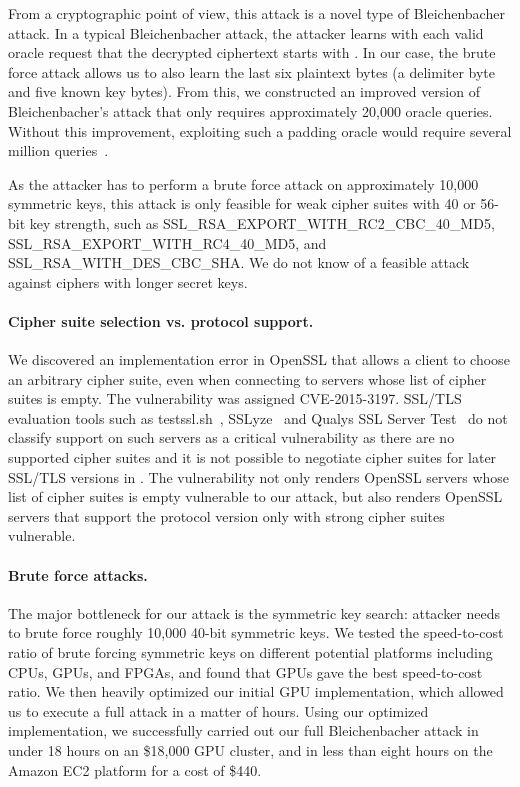 From a cryptographic point of view, this attack is a novel type of Bleichenbacher attack. In a typical Bleichenbacher attack, the attacker learns with each valid oracle request that the decrypted ciphertext starts with . In our case, the brute force attack allows us to also learn the last six plaintext bytes (a delimiter byte  and five known key bytes). From this, we constructed an improved version of Bleichenbacher's attack that only requires approximately 20,000 oracle queries. Without this improvement, exploiting such a padding oracle would require several million queries~\cite{bardou2012efficient}.

As the attacker has to perform a brute force attack on approximately 10,000 symmetric keys, this attack is only feasible for weak cipher suites with 40 or 56-bit key strength, such as SSL\_RSA\_EXPORT\_WITH\_RC2\_CBC\_40\_MD5, SSL\_RSA\_EXPORT\_WITH\_RC4\_40\_MD5, and SSL\_RSA\_WITH\_DES\_CBC\_SHA\@. We do not know of a feasible attack against ciphers with longer secret keys.

\paragraph{Cipher suite selection vs. protocol support.}
We discovered an implementation error in OpenSSL that allows a client to choose an arbitrary \ssltwo cipher suite, even when connecting to servers whose list of \ssltwo cipher suites is empty.
The vulnerability was assigned CVE-2015-3197.
SSL/TLS evaluation tools such as testssl.sh~\cite{testssl}, SSLyze~\cite{sslyze} and Qualys SSL Server Test~\cite{ssltest} do not classify \ssltwo support on such servers as a critical vulnerability as there are no supported cipher suites and it is not possible to negotiate cipher suites for later SSL/TLS versions in \ssltwo.
The vulnerability not only renders OpenSSL servers whose list of \ssltwo cipher suites is empty vulnerable to our attack, but also renders OpenSSL servers that support the \ssltwo protocol version only with strong cipher suites vulnerable.

\paragraph{Brute force attacks.}
The major bottleneck for our attack is the symmetric key search: attacker needs to brute force roughly 10,000 40-bit symmetric keys.
We tested the speed-to-cost ratio of brute forcing symmetric keys on different potential platforms including CPUs, GPUs, and FPGAs, and found that GPUs gave the best speed-to-cost ratio.
We then heavily optimized our initial GPU implementation, which allowed us to execute a full attack in a matter of hours.
Using our optimized implementation, we successfully carried out our full Bleichenbacher attack in under 18 hours on an \$18,000 GPU cluster, and in less than eight hours on the Amazon EC2 platform for a cost of \$440.

